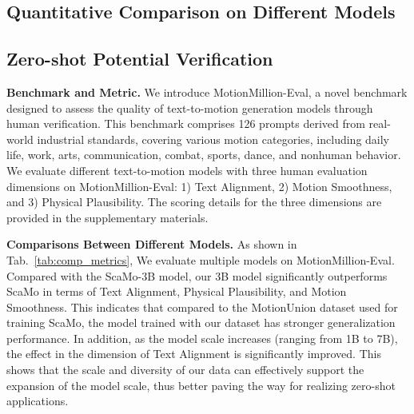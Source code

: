 \subsection{Quantitative Comparison on Different Models}




\subsection{Zero-shot Potential Verification}
\textbf{Benchmark and Metric.}
We introduce MotionMillion-Eval, a novel benchmark designed to assess the quality of text-to-motion generation models through human verification. This benchmark comprises 126 prompts derived from real-world industrial standards, covering various motion categories, including daily life, work, arts, communication, combat, sports, dance, and nonhuman behavior.
We evaluate different text-to-motion models with three human evaluation dimensions on MotionMillion-Eval:
1) Text Alignment, 2) Motion Smoothness, and 3) Physical Plausibility. The scoring details for the three dimensions are provided in the supplementary materials.




\noindent\textbf{Comparisons Between Different Models.} As shown in Tab.~\ref{tab:comp_metrics},
We evaluate multiple models on MotionMillion-Eval. Compared with the ScaMo-3B model, our 3B model significantly outperforms ScaMo in terms of Text Alignment, Physical Plausibility, and Motion Smoothness. This indicates that compared to the MotionUnion dataset used for training ScaMo, the model trained with our dataset has stronger generalization performance. In addition, as the model scale increases (ranging from 1B to 7B), the effect in the dimension of Text Alignment is significantly improved. This shows that the scale and diversity of our data can effectively support the expansion of the model scale, thus better paving the way for realizing zero-shot applications. 

